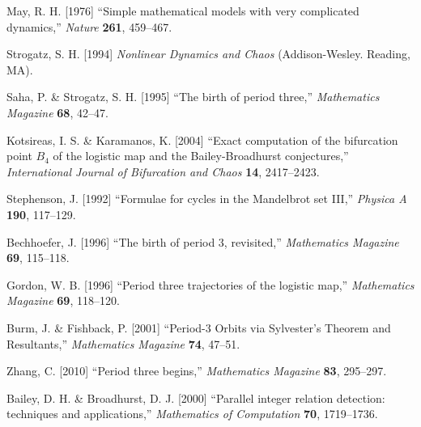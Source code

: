 \documentclass{ws-ijbc}
\begin{document}












\begin{thebibliography}{50}


  May, R. H. [1976]
  ``Simple mathematical models with very complicated dynamics,''
  {\it Nature}
  \textbf{261},
  459--467.

  Strogatz, S. H. [1994]
  {\it Nonlinear Dynamics and Chaos}
  (Addison-Wesley. Reading, MA).

  Saha, P. \& Strogatz, S. H. [1995]
  ``The birth of period three,''
  {\it Mathematics Magazine}
  \textbf{68},
  42--47.

  Kotsireas, I. S. \& Karamanos, K. [2004]
  ``Exact computation of the bifurcation point $B_4$ of the logistic map
  and  the Bailey-Broadhurst conjectures,''
  {\it International Journal of Bifurcation and Chaos}
  \textbf{14},
  2417--2423.

  Stephenson, J. [1992]
  ``Formulae for cycles in the Mandelbrot set III,''
  {\it Physica A}
  \textbf{190},
  117--129.

  Bechhoefer, J. [1996]
  ``The birth of period 3, revisited,''
  {\it Mathematics Magazine}
  \textbf{69},
  115--118.

  Gordon, W. B. [1996]
  ``Period three trajectories of the logistic map,''
  {\it Mathematics Magazine}
  \textbf{69},
  118--120.

  Burm, J. \& Fishback, P. [2001]
  ``Period-3 Orbits via Sylvester's Theorem and Resultants,''
  {\it Mathematics Magazine}
  \textbf{74},
  47--51.

  Zhang, C. [2010]
  ``Period three begins,''
  {\it Mathematics Magazine}
  \textbf{83},
  295--297.

  Bailey, D. H. \& Broadhurst, D. J. [2000]
  ``Parallel integer relation detection: techniques and applications,''
  {\it Mathematics of Computation}
  \textbf{70},
  1719--1736.


\end{thebibliography}
\end{document}
